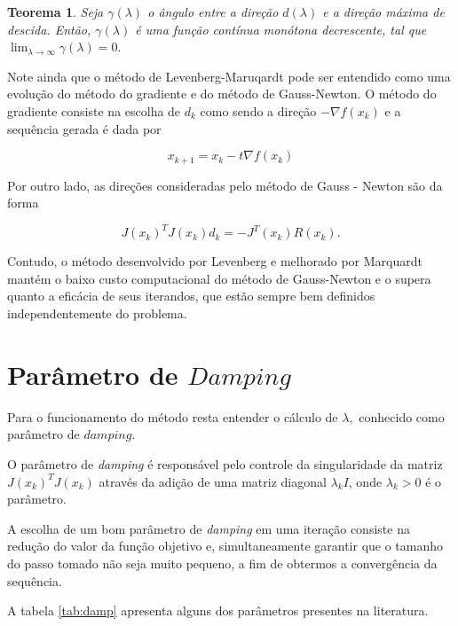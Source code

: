 \documentclass[12pt,a4paper]{article}
\newtheorem{teo}{Teorema}[section]
\newcounter{ex}[section]
\begin{document}
	\begin{teo}
		Seja $\gamma (\lambda)$ o ângulo entre a direção $d(\lambda)$ e a direção máxima de descida. Então, $\gamma(\lambda)$ é uma função contínua monótona decrescente, tal que  $\lim_{\lambda\rightarrow \infty}{\gamma(\lambda)} = 0.$
	\end{teo}

	Note ainda que o método de Levenberg-Maruqardt pode ser entendido como uma evolução do método do gradiente e do método de Gauss-Newton. O método do gradiente consiste na escolha de $d_k$ como sendo a direção $-\nabla f(x_k)$ e a sequência gerada é dada por
	
	\[x_{k+1} = x_k - t \nabla f(x_k)\]
	
	Por outro lado, as direções consideradas pelo método de Gauss - Newton são da forma 
	
	\[ J(x_k)^{T}J(x_k)d_k = -J^T(x_k)R(x_k). \]
	
	Contudo, o método desenvolvido por Levenberg e melhorado por Marquardt mantém o baixo custo computacional do método de Gauss-Newton e o supera quanto a eficácia de seus iterandos, que estão sempre bem definidos independentemente do problema.
		
	\section{Parâmetro de $Damping$}\label{pd}
	\label{sec:subsec02}
	Para o funcionamento do método resta entender o cálculo de $\lambda,$ conhecido como parâmetro de $damping.$ 
	
	O parâmetro de \textit{damping} é responsável pelo controle da singularidade da matriz $J(x_k)^T J(x_k)$ através da adição de uma matriz diagonal $\lambda_k I$, onde $\lambda_k > 0$ é o parâmetro.
	
	A escolha de um bom parâmetro de \textit{damping} em uma iteração consiste na redução do valor da função objetivo e, simultaneamente garantir que o tamanho do passo tomado não seja muito pequeno, a fim de obtermos a convergência da sequência.
	
	A tabela \ref{tab:damp} apresenta alguns dos parâmetros presentes na literatura.
	
\end{document}
